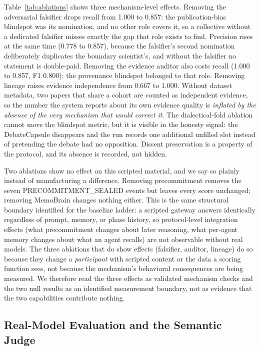 Table~\ref{tab:ablations} shows three mechanism-level effects. Removing the
adversarial falsifier drops recall from 1.000 to 0.857: the publication-bias
blindspot was its nomination, and no other role covers it, so a collective
without a dedicated falsifier misses exactly the gap that role exists to
find. Precision rises at the same time (0.778 to 0.857), because the
falsifier's second nomination deliberately duplicates the boundary
scientist's, and without the falsifier no statement is double-paid. Removing
the evidence auditor also costs recall (1.000 to 0.857, F1 0.800): the
provenance blindspot belonged to that role. Removing lineage raises evidence
independence from 0.667 to 1.000. Without dataset metadata, two papers that
share a cohort are counted as independent evidence, so the number the system
reports about its own evidence quality is \emph{inflated by the absence of
the very mechanism that would correct it}. The dialectical-fold ablation
cannot move the blindspot metric, but it is visible in the honesty signal:
the DebateCapsule disappears and the run records one additional unfilled slot
instead of pretending the debate had no opposition. Dissent preservation is
a property of the protocol, and its absence is recorded, not hidden.

Two ablations show no effect on this scripted material, and we say so
plainly instead of manufacturing a difference. Removing precommitment
removes the seven PRECOMMITMENT\_SEALED events but leaves every score
unchanged; removing MemoBrain changes nothing either. This is the same
structural boundary identified for the baseline ladder: a scripted gateway
answers identically regardless of prompt, memory, or phase history, so
protocol-level integration effects (what precommitment changes about later
reasoning, what per-agent memory changes about what an agent recalls) are not
observable without real models. The three ablations that do show effects
(falsifier, auditor, lineage) do so because they change a \emph{participant}
with scripted content or the data a scoring function sees, not because the
mechanism's behavioral consequences are being measured. We therefore read the
three effects as validated mechanism checks and the two null results as an
identified measurement boundary, not as evidence that the two capabilities
contribute nothing.

\subsection{Real-Model Evaluation and the Semantic Judge}

